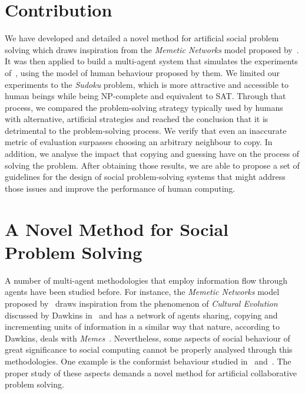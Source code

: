\documentclass{article}
\begin{document}
\section{Contribution}

We have developed and detailed a novel method for artificial social problem solving which draws inspiration from the {\em Memetic Networks} model proposed by~\cite{araujo:memenet}.
It was then applied to build a multi-agent system that simulates the experiments of~\cite{farenzena:collabem}, using the model of human behaviour proposed by them. We limited our experiments to the {\em Sudoku} problem, which is more attractive and accessible to human beings while being NP-complete and equivalent to SAT. Through that process, we compared the problem-solving strategy %
typically used by humans with alternative, artificial strategies and reached the conclusion that it is detrimental to the problem-solving process.
We verify that even an inaccurate metric of evaluation surpasses choosing an arbitrary neighbour to copy.
In addition, we analyse the impact that copying and guessing have on the process of solving the problem. After obtaining those results, we are able to propose a set of guidelines for the design of social problem-solving systems that might address those issues and improve the performance of human computing.

\section{A Novel Method for %
Social Problem Solving}

A number of multi-agent methodologies that employ information flow through agents have been studied before. For instance, the {\em Memetic Networks} model proposed by~\cite{araujo:memenet} draws inspiration from the phenomenon of {\em Cultural Evolution} discussed by Dawkins in~\cite{dawkins:selfishgene} and has a network of agents sharing, copying and incrementing units of information in a similar way that nature, according to Dawkins, deals with {\em Memes}~\cite{dawkins:selfishgene}. Nevertheless, some aspects of social behaviour of great significance to social computing cannot be properly analysed through this methodologies. One example is the conformist behaviour studied in~\cite{cefferson:conformists} and~\cite{farenzena:collabem}. The proper study of these aspects demands a novel method for artificial collaborative problem solving.
\end{document}

